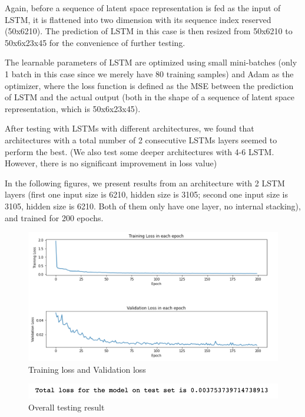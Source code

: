 Again, before a sequence of latent space representation is fed as the input of LSTM, it is flattened into two dimension with its sequence index reserved (50x6210). The prediction of LSTM in this case is then resized from 50x6210 to 50x6x23x45 for the convenience of further testing.

The learnable parameters of LSTM are optimized using small mini-batches (only 1 batch in this case since we merely have 80 training samples) and Adam as the optimizer, where the loss function is defined as the MSE between the prediction of LSTM and the actual output (both in the shape of a sequence of latent space representation, which is 50x6x23x45).

After testing with LSTMs with different architectures, we found that architectures with a total number of 2 consecutive LSTMs layers seemed to perform the best. (We also test some deeper architectures with 4-6 LSTM. However, there is no significant improvement in loss value)

In the following figures, we present results from an architecture with 2 LSTM layers (first one input size is 6210, hidden size is 3105; second one input size is 3105, hidden size is 6210. Both of them only have one layer, no internal stacking), and trained for 200 epochs.

\begin{figure}[H]
    \caption{Training loss and Validation loss}
    \includegraphics[scale=0.6]{Report LaTeX/figures/mantle_convection_images/limited_dataset/LSTM_trainingData.png}
\end{figure}

\begin{figure}[H]
    \caption{Overall testing result}
    \includegraphics[scale=0.8]{Report LaTeX/figures/mantle_convection_images/limited_dataset/LSTM_OverallTesting.png}
\end{figure}

